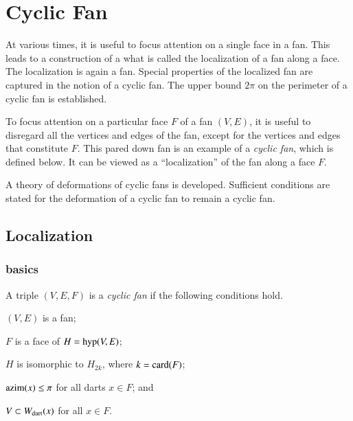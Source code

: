 %

\chapter{Cyclic Fan}\label{sec:cyclic}


\begin{summary}
At various times, it is useful to focus attention on a single face in a fan.  This leads to a construction of a what is called the localization of a fan along a face.  The localization is again a fan.  Special properties of the localized fan are captured in the notion of a cyclic fan.  The upper bound $2\pi$ on the perimeter of a cyclic fan is established.


To focus attention on a particular face $F$ of a fan $(V,E)$, it is useful to disregard all the vertices
and edges of the fan, except for the vertices and edges that constitute $F$.  This pared down fan
is an example of a {\it cyclic fan}, which is defined below.  It can be viewed as a ``localization'' of
the fan along a face $F$.  

A theory of deformations of cyclic fans is developed.  Sufficient conditions are stated for the deformation of a cyclic fan to remain a cyclic fan.
\end{summary}


\section{Localization}


\subsection{basics}


\begin{definition}  A triple $(V,E,F)$ is a {\it cyclic fan} if the following conditions hold.
\begin{nomerate} 
\item {} $(V,E)$ is a fan;
\item {} $F$ is a face of $H = {\operatorname{hyp}}(V,E)$;
\item {} $H$ is isomorphic to $H_{2k}$, where $k = {\operatorname{card}}(F)$;
\item {} ${\operatorname{azim}}(x)\le \pi$ for all darts $x\in F$; and
\item {} $V\subset W_{\text{dart}}(x)$ for all $x\in F$.
\end{nomerate}
\end{definition}
%


